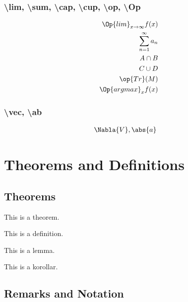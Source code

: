 \subsubsection{\textbackslash{lim}, \textbackslash{sum}, \textbackslash{cap}, \textbackslash{cup}, \textbackslash{op}, \textbackslash{Op}}
    \begin{align*}
        \Op{lim}_{x \to \infty} f(x) \\
        \sum_{n=1}^{\infty} a_n \\
        A \cap B \\
        C \cup D \\
        \op{Tr}(M) \\
        \Op{argmax}_{x} f(x)
    \end{align*}

\subsubsection{\textbackslash{vec}, \textbackslash{ab}}
    \begin{align*}
        \Nabla{V} &, \abs{a}
    \end{align*}

\section{Theorems and Definitions}

\subsection{Theorems}

\begin{theorem}
    This is a theorem.
\end{theorem}

\begin{definition}
    This is a definition.
\end{definition}

\begin{lemma}
    This is a lemma.
\end{lemma}

\begin{corollary}
    This is a korollar.
\end{corollary}

\subsection{Remarks and Notation}

